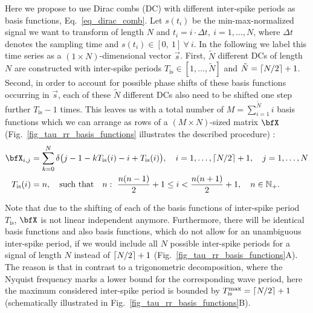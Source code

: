 \documentclass[entropy,article,submit,pdftex,moreauthors]{Definitions/mdpi}
\DeclarePairedDelimiter\ceil{\lceil}{\rceil}
\begin{document}
Here we propose to use Dirac combs (DC) with 
different inter-spike periods as basis functions, Eq.~\eqref{eq_dirac_comb}. Let $s(t_i)$ be the min-max-normalized signal we want to transform of length $N$ and 
$t_i=i\cdot \Delta t,~i=1,\ldots,N$, where $\Delta t$ denotes the sampling time and $s(t_i) \in [0,\ 1]\ \forall\ i$. In the following we label this time series as a $(1\times N)$-dimensional 
vector $\vec{s}$. 
First, $\tilde{N}$ different DCs of length $N$ are constructed with inter-spike periods $T_\text{is} \in [1,\ldots,\tilde{N}]$ and $\tilde{N}=\ceil*{N/2}+1$. Second, in order to account 
for possible phase shifts of 
these basis functions occurring in $\vec{s}$, each of these $\tilde{N}$ different DCs also need to be shifted one step further $T_\text{is}-1$ times. This leaves us with a total number of 
$M = \sum_{i=1}^{\tilde{N}}i$ 
basis functions which we can arrange as rows of a $(M\times N)$-sized matrix $\bfX$
(Fig.~\ref{fig_tau_rr_basis_functions} illustrates the described procedure) :
\begin{align}
\label{eq_basis_matrix} 
\bfX_{i,j} &= \sum_{k=0}^{N}\delta\bigl(j-1-kT_\text{is}(i)-i+T_\text{is}(i) \bigr), \quad i=1,\dots,\ceil*{N/2}+1, \quad j=1,\dots,N\\
\label{eq_T_is} T_\text{is}(i)&= n, \quad \text{such that}\quad n:~ \frac{n(n-1)}{2} + 1 \leq i <  \frac{n(n+1)}{2} + 1,\quad n \in \mathbb{N}_+.
\end{align}

Note that due to the shifting of each of the basis functions of inter-spike period $T_\text{is}$, $\bfX$ is not linear independent anymore. 
Furthermore, there will be identical basis functions and also basis functions, which do not allow for an unambiguous inter-spike period, 
if we would include all $N$ possible inter-spike periods for a signal of length $N$ instead of $\ceil*{N/2}+1$ (Fig.~\ref{fig_tau_rr_basis_functions}A).
The reason is that in contrast to a trigonometric decomposition, where the Nyquist frequency marks a lower bound for the corresponding wave period, here 
the maximum considered inter-spike period is bounded by $T_{\text{is}}^{\text{max}} = \ceil*{N/2}+1$ (schematically illustrated in 
Fig.~\ref{fig_tau_rr_basis_functions}B). 
\end{document}
